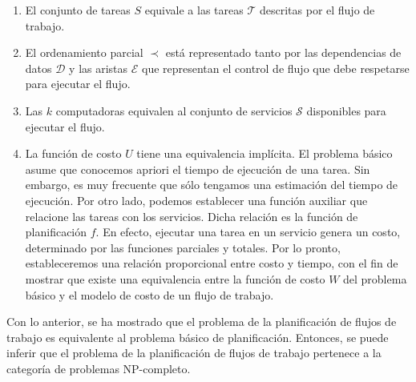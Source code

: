 \begin{enumerate}
\item El conjunto de tareas $S$ equivale a las tareas $\mathcal{T}$ descritas por el flujo de trabajo.

\item El ordenamiento parcial $\prec$ está representado tanto por las dependencias de datos $\mathcal{D}$ y las aristas $\mathcal{E}$ que representan el control de flujo que debe respetarse para ejecutar el flujo.

\item Las $k$ computadoras equivalen al conjunto de servicios $\mathcal{S}$ disponibles para ejecutar el flujo.

\item La función de costo $U$ tiene una equivalencia implícita. El problema básico asume que conocemos apriori el tiempo de ejecución de una tarea. Sin embargo, es muy frecuente que sólo tengamos una estimación del tiempo de ejecución. Por otro lado, podemos establecer una función auxiliar que relacione las tareas con los servicios. Dicha relación es la función de planificación $f$. En efecto, ejecutar una tarea en un servicio genera un costo, determinado por las funciones parciales y totales. Por lo pronto, estableceremos una relación proporcional entre costo y tiempo, con el fin de mostrar que existe una equivalencia entre la función de costo $W$ del problema básico y el modelo de costo de un flujo de trabajo.
\end{enumerate}

Con lo anterior, se ha mostrado que el problema de la planificación de flujos de trabajo es equivalente al problema básico de planificación. Entonces, se puede inferir que el problema de la planificación de flujos de trabajo pertenece a la categoría de problemas NP-completo.


